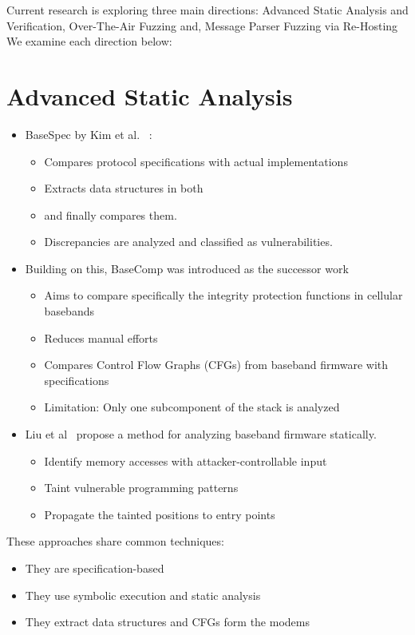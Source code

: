 Current research is exploring three main directions: 
Advanced Static Analysis and Verification, Over-The-Air Fuzzing and, Message Parser Fuzzing via Re-Hosting
We examine each direction below:


\section{Advanced Static Analysis}
\begin{itemize}
  \item BaseSpec by Kim et al. ~\cite{Kim21}:
    \begin{itemize}
      \item Compares protocol specifications with actual implementations
      \item Extracts data structures in both
      \item and finally compares them.
      \item Discrepancies are analyzed and classified as vulnerabilities.
    \end{itemize}
  \item Building on this, BaseComp was introduced as the successor work~\cite{Kim23}
    \begin{itemize}
      \item Aims to compare specifically the integrity protection functions in cellular basebands
      \item Reduces manual efforts
      \item Compares Control Flow Graphs (CFGs) from baseband firmware with specifications
      \item Limitation: Only one subcomponent of the stack is analyzed
    \end{itemize}
  \item Liu et al~\cite{Liu24} propose a method for analyzing baseband firmware statically.
    \begin{itemize}
      \item Identify memory accesses with attacker-controllable input
      \item Taint vulnerable programming patterns 
      \item Propagate the tainted positions to entry points
    \end{itemize}
\end{itemize}

These approaches share common techniques:
\begin{itemize}
  \item They are specification-based
  \item They use symbolic execution and static analysis
  \item They extract data structures and CFGs form the modems
\end{itemize}

